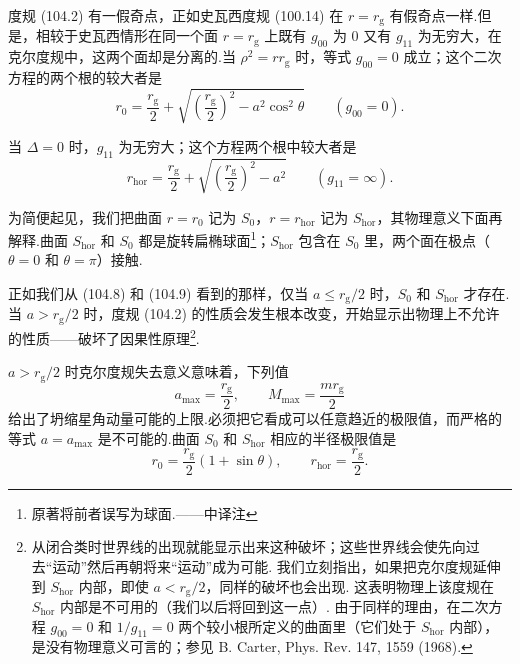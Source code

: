 度规 (104.2) 有一假奇点，正如史瓦西度规 (100.14) 在 $r=r_{\mathrm{g}}$ 有假奇点一样.但是，相较于史瓦西情形在同一个面 $r=r_{\mathrm{g}}$ 上既有 $g_{00}$ 为 0 又有 $g_{11}$ 为无穷大，在克尔度规中，这两个面却是分离的.当 $\rho^{2}=rr_{\mathrm{g}}$ 时，等式 $g_{00}=0$ 成立；这个二次方程的两个根的较大者是
\begin{equation}
  r_0=\frac{r_{\mathrm{g}}}{2}
  +\sqrt{\left(\frac{r_{\mathrm{g}}}{2}\right)^{2}
  -a^{2}\cos^{2}\theta}
  \qquad(g_{00}=0).
\end{equation}

当 $\varDelta=0$ 时，$g_{11}$ 为无穷大；这个方程两个根中较大者是
\begin{equation}
  r_{\mathrm{hor}}=\frac{r_{\mathrm{g}}}{2}
  +\sqrt{\left(\frac{r_{\mathrm{g}}}{2}\right)^{2}-a^{2}}
  \qquad(g_{11}=\infty).
\end{equation}

为简便起见，我们把曲面 $r=r_0$ 记为 $S_0$，$r=r_{\mathrm{hor}}$ 记为 $S_{\mathrm{hor}}$，其物理意义下面再解释.曲面 $S_{\mathrm{hor}}$ 和 $S_0$ 都是旋转扁椭球面\footnote{原著将前者误写为球面.——中译注}；$S_{\mathrm{hor}}$ 包含在 $S_0$ 里，两个面在极点（$\theta=0$ 和 $\theta=\pi$）接触.

正如我们从 (104.8) 和 (104.9) 看到的那样，仅当 $a\leqslant r_{\mathrm{g}}/2$ 时，$S_0$ 和 $S_{\mathrm{hor}}$ 才存在.当 $a>r_{\mathrm{g}}/2$ 时，度规 (104.2) 的性质会发生根本改变，开始显示出物理上不允许的性质——破坏了因果性原理\footnote{从闭合类时世界线的出现就能显示出来这种破坏；这些世界线会使先向过去“运动”然后再朝将来“运动”成为可能. 我们立刻指出，如果把克尔度规延伸到 $S_{\mathrm{hor}}$ 内部，即使 $a<r_{\mathrm{g}}/2$，同样的破坏也会出现. 这表明物理上该度规在 $S_{\mathrm{hor}}$ 内部是不可用的（我们以后将回到这一点）. 由于同样的理由，在二次方程 $g_{00}=0$ 和 $1/g_{11}=0$ 两个较小根所定义的曲面里（它们处于 $S_{\mathrm{hor}}$ 内部），是没有物理意义可言的；参见 B. Carter, Phys. Rev. 147, 1559 (1968).}.

$a>r_{\mathrm{g}}/2$ 时克尔度规失去意义意味着，下列值
\begin{equation}
  a_{\mathrm{max}}=\frac{r_{\mathrm{g}}}{2},
  \qquad
  M_{\mathrm{max}}=\frac{mr_{\mathrm{g}}}{2}
\end{equation}
给出了坍缩星角动量可能的上限.必须把它看成可以任意趋近的极限值，而严格的等式 $a=a_{\mathrm{max}}$ 是不可能的.曲面 $S_0$ 和 $S_{\mathrm{hor}}$ 相应的半径极限值是
\begin{equation}
  r_0=\frac{r_{\mathrm{g}}}{2}(1+\sin\theta),
  \qquad
  r_{\mathrm{hor}}=\frac{r_{\mathrm{g}}}{2}.
\end{equation}

